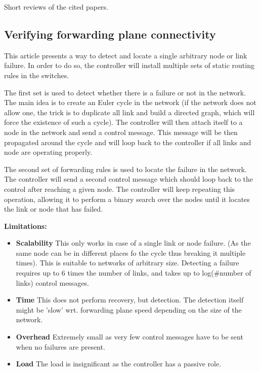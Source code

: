 \documentclass[compsoc]{IEEEtran}
\begin{document}

\nocite{*}


\appendix
Short reviews of the cited papers.
\subsection{Verifying forwarding plane connectivity \cite{2013arXiv1308.4465K}}
This article presents a way to detect and locate a single arbitrary node or link failure.
In order to do so, the controller will install multiple sets of static routing rules in the switches.

The first set is used to detect whether there is a failure or not in the network.
The main idea is to create an Euler cycle in the network (if the network does not allow one, the trick is to duplicate all link and build a directed graph, which will force the existence of such a cycle). The controller will then attach itself to a node in the network and send a control message. This message will be then propagated around the cycle and will loop back to the controller if all links and node are operating properly.

The second set of forwarding rules is used to locate the failure in the network. The controller will send a second control message which should loop back to the control after reaching a given node. The controller will keep repeating this operation, allowing it to perform a binary search over the nodes until it locates the link or node that has failed.

\textbf{Limitations:}
\begin{itemize}
	\item \textbf{Scalability} This only works in case of a single link or node failure. (As the same node can be in different places fo the cycle thus breaking it multiple times). This is suitable to networks of arbitrary size. Detecting a failure requires up to 6 times the number of links, and takes up to log(\#number of links) control messages.
	\item \textbf{Time} This does not perform recovery, but detection. The detection itself might be 'slow' wrt. forwarding plane speed depending on the size of the network.
	\item \textbf{Overhead} Extremely small as very few control messages have to be sent when no failures are present.
	\item \textbf{Load} The load is insignificant as the controller has a passive role.
\end{itemize}
\end{document}
